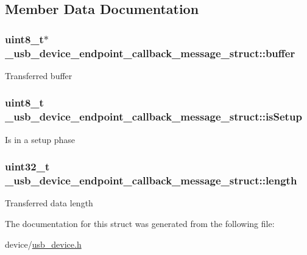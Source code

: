\subsection{Member Data Documentation}
\hypertarget{struct__usb__device__endpoint__callback__message__struct_ad183f5b363378846e13033bafbfc9398}{
\subsubsection[{buffer}]{\setlength{\rightskip}{0pt plus 5cm}uint8\-\_\-t$\ast$ \-\_\-usb\-\_\-device\-\_\-endpoint\-\_\-callback\-\_\-message\-\_\-struct\-::buffer}}\label{struct__usb__device__endpoint__callback__message__struct_ad183f5b363378846e13033bafbfc9398}
Transferred buffer \hypertarget{struct__usb__device__endpoint__callback__message__struct_a72f4d74684d9baa0a3b8b5b29119cd28}{
\subsubsection[{is\-Setup}]{\setlength{\rightskip}{0pt plus 5cm}uint8\-\_\-t \-\_\-usb\-\_\-device\-\_\-endpoint\-\_\-callback\-\_\-message\-\_\-struct\-::is\-Setup}}\label{struct__usb__device__endpoint__callback__message__struct_a72f4d74684d9baa0a3b8b5b29119cd28}
Is in a setup phase \hypertarget{struct__usb__device__endpoint__callback__message__struct_a3ec34e2b26c6eb038d43b11ecc945c07}{
\subsubsection[{length}]{\setlength{\rightskip}{0pt plus 5cm}uint32\-\_\-t \-\_\-usb\-\_\-device\-\_\-endpoint\-\_\-callback\-\_\-message\-\_\-struct\-::length}}\label{struct__usb__device__endpoint__callback__message__struct_a3ec34e2b26c6eb038d43b11ecc945c07}
Transferred data length 

The documentation for this struct was generated from the following file\-:\begin{DoxyCompactItemize}
\item 
device/\hyperlink{usb__device_8h}{usb\-\_\-device.\-h}\end{DoxyCompactItemize}
